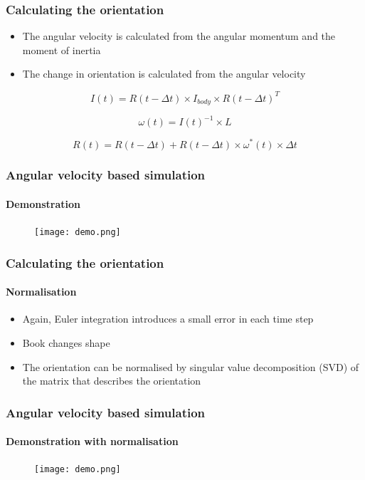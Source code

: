 \documentclass{beamer}
\begin{document}
\begin{frame}
 \frametitle{Calculating the orientation}
 \begin{itemize}
  \item The angular velocity is calculated from the angular momentum and the moment of inertia
  \item The change in orientation is calculated from the angular velocity
 \end{itemize}

\begin{displaymath}
 I(t) = R(t - \Delta t) \times I_{body} \times R(t - \Delta t)^{T}
\end{displaymath}

\begin{displaymath}
 \omega(t) = I(t)^{-1} \times L
\end{displaymath}

\begin{displaymath}
 R(t) = R(t - \Delta t) + R(t - \Delta t) \times \omega^*(t) \times \Delta t
\end{displaymath}


\end{frame}

\begin{frame}
 \frametitle{Angular velocity based simulation}
 \framesubtitle{Demonstration}
 \begin{figure}
  \centering
  \texttt{[image: demo.png]}
 \end{figure}
\end{frame}

\begin{frame}
 \frametitle{Calculating the orientation} 
 \framesubtitle{Normalisation}
 \begin{itemize}
  \item Again, Euler integration introduces a small error in each time step
  \item Book changes shape
  \item The orientation can be normalised by singular value decomposition (SVD) of the matrix that describes the orientation
 \end{itemize}
\end{frame}

\begin{frame}
 \frametitle{Angular velocity based simulation}
 \framesubtitle{Demonstration with normalisation}
 \begin{figure}
  \centering
  \texttt{[image: demo.png]}
 \end{figure}
\end{frame}
\end{document}
